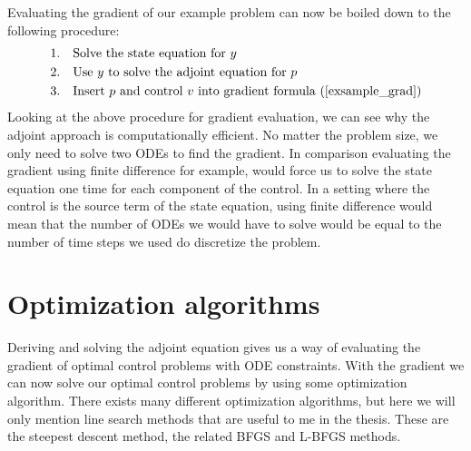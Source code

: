 Evaluating the gradient of our example problem can now be boiled down to the following procedure:
\begin{align*}
1.\quad & \textrm{Solve the state equation for $y$}\\
2.\quad & \textrm{Use $y$ to solve the adjoint equation for $p$}\\
3.\quad & \textrm{Insert $p$ and control $v$ into gradient formula (\ref{exsample_grad})}
\end{align*}
Looking at the above procedure for gradient evaluation, we can see why the adjoint approach is computationally efficient. No matter the problem size, we only need to solve two ODEs to find the gradient. In comparison evaluating the gradient using finite difference for example, would force us to solve the state equation one time for each component of the control. In a setting where the control is the source term of the state equation, using finite difference would mean that the number of ODEs we would have to solve would be equal to the number of time steps we used do discretize the problem.
\section{Optimization algorithms}
Deriving and solving the adjoint equation gives us a way of evaluating the gradient of optimal control problems with ODE constraints. With the gradient we can now solve our optimal control problems by using some optimization algorithm. There exists many different optimization algorithms, but here we will only mention line search methods that are useful to me in the thesis. These are the steepest descent method, the related BFGS and L-BFGS methods.  
